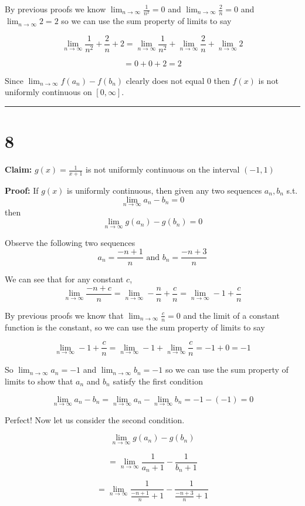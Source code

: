\documentclass[10pt,letterpaper]{article}
\newcommand\ds{\displaystyle}
\newcommand\qedsym{\hfill \rule{2mm}{2mm}}
\begin{document}
By previous proofs we know $\ds\lim_{n\to\infty}\frac{1}{n^2} = 0$ and $\ds\lim_{n\to\infty}\frac{2}{n}=0$ and $\ds\lim_{n\to\infty}2=2$ so we can use the sum property of limits to say

\[\lim_{n\to\infty}\frac{1}{n^2}+\frac{2}{n}+2 =\lim_{n\to\infty}\frac{1}{n^2}+\lim_{n\to\infty}\frac{2}{n}+\lim_{n\to\infty}2\]

\[=0+0+2=2\]

Since $\ds\lim_{n\to\infty}f(a_n)-f(b_n)$ clearly does not equal $0$ then $f(x)$ is not uniformly continuous on $[0, \infty]$.

\qedsym

\section*{8}

\textbf{Claim:} $g(x) = \frac{1}{x+1}$ is not uniformly continuous on the interval $(-1, 1)$

\medskip

\textbf{Proof:} If $g(x)$ is uniformly continuous, then given any two sequences $a_n, b_n$ s.t. \[\ds\lim_{n\to\infty}a_n-b_n = 0\] then \[\ds\lim_{n\to\infty}g(a_n)-g(b_n) = 0\]

Observe the following two sequences
\[a_n = \frac{-n+1}{n} \text{ and } b_n = \frac{-n+3}{n}\]

We can see that for any constant $c$,
\[\lim_{n\to\infty}\frac{-n+c}{n} = \lim_{n\to\infty}-\frac{n}{n} + \frac{c}{n}=\lim_{n\to\infty}-1 + \frac{c}{n}\]

By previous proofs we know that $\ds\lim_{n\to\infty}\frac{c}{n} = 0$ and the limit of a constant function is the constant, so we can use the sum property of limits to say

\[\lim_{n\to\infty}-1 + \frac{c}{n} = \lim_{n\to\infty}-1 + \lim_{n\to\infty}\frac{c}{n}=-1+0=-1\]

So $\lim_{n\to\infty}a_n = -1$ and $\lim_{n\to\infty}b_n=-1$ so we can use the sum property of limits to show that $a_n$ and $b_n$ satisfy the first condition

\[\ds\lim_{n\to\infty}a_n-b_n = \lim_{n\to\infty}a_n - \lim_{n\to\infty}b_n = -1-(-1) = 0\]

Perfect! Now let us consider the second condition.

\[\ds\lim_{n\to\infty}g(a_n)-g(b_n)\]

\[=\ds\lim_{n\to\infty}\frac{1}{a_n+1}-\frac{1}{b_n+1}\]

\[=\ds\lim_{n\to\infty}\frac{1}{\frac{-n+1}{n}+1}-\frac{1}{\frac{-n+3}{n}+1}\]
\end{document}

